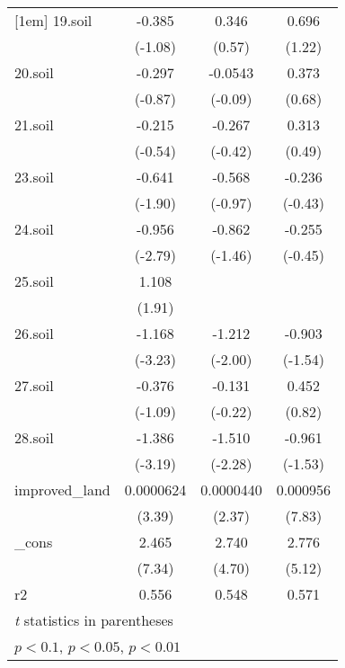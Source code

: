 {\begin{tabular}{l*{3}{c}}
[1em]
19.soil     &      -0.385         &       0.346         &       0.696         \\
            &     (-1.08)         &      (0.57)         &      (1.22)         \\
[1em]
20.soil     &      -0.297         &     -0.0543         &       0.373         \\
            &     (-0.87)         &     (-0.09)         &      (0.68)         \\
[1em]
21.soil     &      -0.215         &      -0.267         &       0.313         \\
            &     (-0.54)         &     (-0.42)         &      (0.49)         \\
[1em]
23.soil     &      -0.641\sym{*}  &      -0.568         &      -0.236         \\
            &     (-1.90)         &     (-0.97)         &     (-0.43)         \\
[1em]
24.soil     &      -0.956\sym{***}&      -0.862         &      -0.255         \\
            &     (-2.79)         &     (-1.46)         &     (-0.45)         \\
[1em]
25.soil     &       1.108\sym{*}  &                     &                     \\
            &      (1.91)         &                     &                     \\
[1em]
26.soil     &      -1.168\sym{***}&      -1.212\sym{**} &      -0.903         \\
            &     (-3.23)         &     (-2.00)         &     (-1.54)         \\
[1em]
27.soil     &      -0.376         &      -0.131         &       0.452         \\
            &     (-1.09)         &     (-0.22)         &      (0.82)         \\
[1em]
28.soil     &      -1.386\sym{***}&      -1.510\sym{**} &      -0.961         \\
            &     (-3.19)         &     (-2.28)         &     (-1.53)         \\
[1em]
improved\_land&   0.0000624\sym{***}&   0.0000440\sym{**} &    0.000956\sym{***}\\
            &      (3.39)         &      (2.37)         &      (7.83)         \\
[1em]
\_cons      &       2.465\sym{***}&       2.740\sym{***}&       2.776\sym{***}\\
            &      (7.34)         &      (4.70)         &      (5.12)         \\
\hline
r2          &       0.556         &       0.548         &       0.571         \\
\hline\hline
\multicolumn{4}{l}{\footnotesize \textit{t} statistics in parentheses}\\
\multicolumn{4}{l}{\footnotesize \sym{*} \(p<0.1\), \sym{**} \(p<0.05\), \sym{***} \(p<0.01\)}\\
\end{tabular}
}
